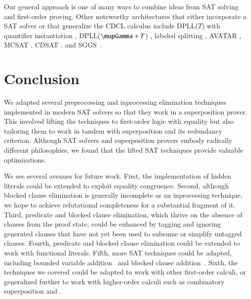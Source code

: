 Our general approach is one of many ways to combine ideas from SAT solving and
first-order proving. Other noteworthy architectures that either incorporate a
SAT solver or that generalize the CDCL calculus include DPLL($T$) with
quantifier instantiation
\cite{de-moura-bjoerner-2007,barbosa-et-al-2017,reynolds-et-al-2018},
DPLL($\mupGamma+T$) \cite{bonacina-et-al-2009},
labeled splitting \cite{fietzke-weidenbach-2009},
AVATAR \cite{av-2014-avatar},
MCSAT \cite{de-moura-jovanovic-2013},
CDSAT \cite{bonacina-et-al-2017}, and
SGGS~\cite{bonacina-plaisted-2014}.

\section{Conclusion}
\label{sec:satfol:conclusion}

We adapted several preprocessing and inprocessing elimination techniques implemented in
modern SAT solvers so that they work in a superposition prover. This involved lifting
the techniques to first-order logic with equality but also tailoring them to
work in tandem with superposition and its redundancy criterion.
Although SAT solvers and superposition provers embody radically different
philosophies, we found that the lifted SAT techniques provide valuable optimizations.

\pagebreak[2]
We see several avenues for future work. First, the implementation of hidden
literals could be extended to exploit equality congruence. Second, although
blocked clause elimination is generally incomplete as an inprocessing technique,
we hope to achieve
refutational completeness for a substantial fragment of it. Third, predicate and
blocked clause elimination, which thrive on the absence of clauses from the
proof state, could be enhanced by tagging and ignoring generated clauses that
have not yet been used to subsume or simplify untagged clauses. Fourth,
predicate and blocked clause elimination could be extended to work with
functional literals. Fifth, more SAT techniques could be adapted, including
bounded variable addition~\cite{mhb-12-reencoding} and blocked clause
addition~\cite{ok-99-er}. Sixth, the techniques we covered could be adapted to
work with other first-order calculi, or generalized
further to work with higher-order calculi such as combinatory superposition
\cite{br-20-full-sup-w-combs} and \osup{}.
